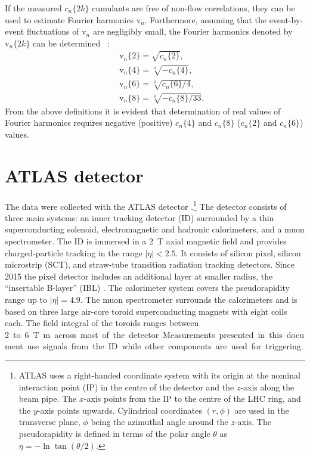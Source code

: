 \documentclass[cernpreprint,texlive=2014,txfonts,UKenglish]{latex/atlasdoc}
\begin{document}
If the measured $c_n\{2k\}$ cumulants are free of non-flow correlations, they can be used to estimate Fourier harmonics $\mathrm{v}_n$. Furthermore, assuming that the event-by-event fluctuations of $\mathrm{v}_n$ are negligibly small, the Fourier harmonics denoted by $\mathrm{v}_n\{2k\}$ can be determined ~\cite{Borghini:2000}:
\begin{eqnarray}
  &&  \label{eq:vn2} \mathrm{v}_n\{2\}=\sqrt{c_n\{2\}},\\
  &&  \label{eq:vn4} \mathrm{v}_n\{4\}=\sqrt[4]{-c_n\{4\}},\\
  &&  \label{eq:vn6} \mathrm{v}_n\{6\}=\sqrt[6]{c_n\{6\}/4},\\
  &&  \label{eq:vn8} \mathrm{v}_n\{8\}=\sqrt[8]{-c_n\{8\}/33}.
\end{eqnarray}
From the above definitions it is evident that determination of real values of Fourier harmonics  requires negative (positive) $c_n\{4\}$ and $c_n\{8\}$ ($c_n\{2\}$ and $c_n\{6\}$) values. 
\section{ATLAS detector}
\label{sec:detector}
The data were collected with the ATLAS detector \cite{atlas-detector}.\footnote{ATLAS uses a right-handed coordinate system with its origin at the nominal interaction point (IP)
in the centre of the detector and the $z$-axis along the beam pipe.
The $x$-axis points from the IP to the centre of the LHC ring,
and the $y$-axis points upwards.
Cylindrical coordinates $(r,\phi)$ are used in the transverse plane, 
$\phi$ being the azimuthal angle around the $z$-axis.
The pseudorapidity is defined in terms of the polar angle $\theta$ as $\eta = -\ln \tan(\theta/2)$.}
The detector consists of three main systems: an inner tracking detector (ID) surrounded by a thin superconducting solenoid, electromagnetic and hadronic calorimeters,
and a muon spectrometer.  The ID is immersed in a \SI{2}{\tesla} axial magnetic field and provides charged-particle tracking in the range $|\eta| < 2.5$. It consists of silicon pixel, silicon microstrip (SCT), and straw-tube transition radiation tracking detectors. Since 2015 the pixel detector includes an additional layer at smaller radius, the “insertable B-layer” (IBL) \cite{ATLAS-TDR-19}. The calorimeter system covers the pseudorapidity range up to $|\eta| = 4.9$. The muon spectrometer surrounds the calorimeters and is based on
three large air-core toroid superconducting magnets with eight coils each.
The field integral of the toroids ranges between \SI{2}  to \SI{6}{\tesla\metre} across most of the detector.
Measurements presented in this document  use signals from the ID while other components are used for triggering. 
\end{document}
